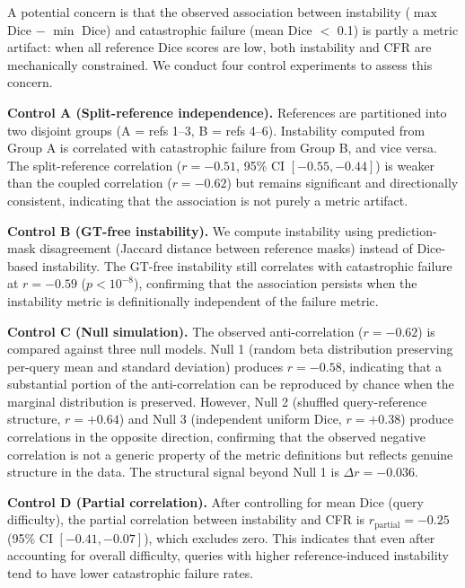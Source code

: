 \documentclass[11pt]{article}
\begin{document}
A potential concern is that the observed association between instability
($\max$ Dice $-$ $\min$ Dice) and catastrophic failure (mean Dice $<$ 0.1)
is partly a metric artifact: when all reference Dice scores are low, both
instability and CFR are mechanically constrained. We conduct four control
experiments to assess this concern.

\medskip\noindent
\textbf{Control A (Split-reference independence).} References are partitioned
into two disjoint groups (A = refs 1--3, B = refs 4--6). Instability computed
from Group A is correlated with catastrophic failure from Group B, and vice
versa. The split-reference correlation ($r = -0.51$, 95\% CI $[-0.55, -0.44]$)
is weaker than the coupled correlation ($r = -0.62$) but remains significant
and directionally consistent, indicating that the association is not purely a
metric artifact.

\medskip\noindent
\textbf{Control B (GT-free instability).} We compute instability using
prediction-mask disagreement (Jaccard distance between reference masks)
instead of Dice-based instability. The GT-free instability still correlates
with catastrophic failure at $r = -0.59$ ($p < 10^{-8}$), confirming that
the association persists when the instability metric is
definitionally independent of the failure metric.

\medskip\noindent
\textbf{Control C (Null simulation).} The observed anti-correlation
($r=-0.62$) is compared against three null models. Null 1 (random beta
distribution preserving per-query mean and standard deviation) produces
$r=-0.58$, indicating that a substantial portion of the anti-correlation can
be reproduced by chance when the marginal distribution is preserved. However,
Null 2 (shuffled query-reference structure, $r=+0.64$) and Null 3
(independent uniform Dice, $r=+0.38$) produce correlations in the opposite
direction, confirming that the observed negative correlation is not a
generic property of the metric definitions but reflects genuine structure in
the data. The structural signal beyond Null 1 is $\Delta r = -0.036$.

\medskip\noindent
\textbf{Control D (Partial correlation).} After controlling for mean Dice
(query difficulty), the partial correlation between instability and CFR is
$r_{\text{partial}} = -0.25$ (95\% CI $[-0.41, -0.07]$), which excludes
zero. This indicates that even after accounting for overall difficulty,
queries with higher reference-induced instability tend to have lower
catastrophic failure rates.
\end{document}
